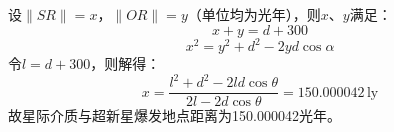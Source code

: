 \documentclass[a4paper,fontset=none]{ctexart}
\begin{document}
\begin{itemize}
        设$\|SR\| = x$，$\|OR\| = y$（单位均为光年），则$x$、$y$满足：
        \[
        x + y = d + 300
        \]
        \[
        x^2 = y^2 + d^2 - 2yd\cos\alpha
        \]
        令$l = d + 300$，则解得：
        \[
        x = \frac{l^2 + d^2 - 2ld\cos\theta}{2l - 2d\cos\theta} = 150.000042\,\mathrm{ly}
        \]
        故星际介质与超新星爆发地点距离为150.000042光年。

    \end{itemize}
\end{document}

